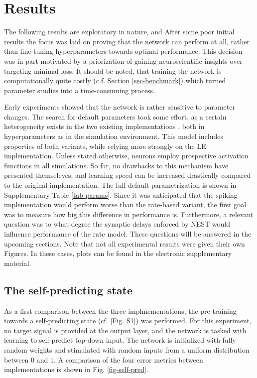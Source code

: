 
\chapter{Results}

The following results are exploratory in nature, and After some poor initial results the focus was laid on proving that
the network can perform at all, rather than fine-tuning hyperparameters towards optimal performance. This decision was
in part motivated by a priorization of gaining neuroscientific insights over targeting minimal loss. It should be noted,
that training the network is computationally quite costly (c.f. Section \ref{sec-benchmark}) which turned parameter
studies into a time-consuming process.

Early experiments showed that the network is rather sensitive to parameter changes. The search for default parameters
took some effort, as a certain heterogeneity exists in the two existing implementations
\citep{sacramento2018dendritic,Haider2021}, both in hyperparameters as in the simulation environment. This model
includes properties of both variants, while relying more strongly on the LE implementation. Unless stated otherwise,
neurons employ prospective activation functions in all simulations. So far, no drawbacks to this mechanism have
presented themseleves, and learning speed can be increased drastically compared to the original implementation. The full
default parametrization is shown in Supplementary Table \ref{tab-params}. Since it was anticipated that the spiking
implementation would perform worse than the rate-based variant, the first goal was to measure how big this difference in
performance is. Furthermore, a relevant question was to what degree the synaptic delays enforced by NEST would influence
performance of the rate model. These questions will be answered in the upcoming sections. Note that not all experimental
results were given their own Figures. In these cases, plots can be found in the electronic supplementary material.


\section{The self-predicting state}

As a first comparison between the three implmementations, the pre-training towards a self-predicting state (cf.
\citep{sacramento2018dendritic}[Fig. S1]) was performed. For this experiment, no target signal is provided at the output
layer, and the network is tasked with learning to self-predict top-down input. The network is initialized with fully
random weights and stimulated with random inputs from a uniform distribution between 0 and 1. A comparison of the four
error metrics between implementations is shown in Fig. \ref{fig-self-pred}.



